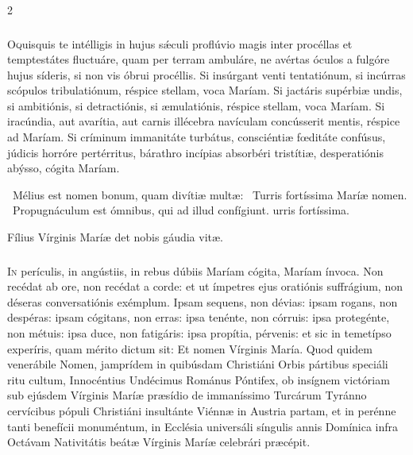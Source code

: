 \documentclass[9pt,twoside]{extarticle}
\begin{document}
\begin{multicols}{2}
\subsubsection*{\center {}}
\lettrine{O} quisquis te intélligis in hujus sǽculi proflúvio magis inter procéllas et temptestátes fluctuáre, quam per terram ambuláre, ne avértas óculos a fulgóre hujus síderis, si non vis óbrui procéllis. Si insúrgant venti tentatiónum, si incúrras scópulos tribulatiónum, réspice stellam, voca Maríam. Si jactáris supérbiæ undis, si ambitiónis, si detractiónis, si æmulatiónis, réspice stellam, voca Maríam. Si iracúndia, aut avarítia, aut carnis illécebra navículam concússerit mentis, réspice ad Maríam. Si críminum immanitáte turbátus, consciéntiæ fœditáte confúsus, júdicis horróre pertérritus, bárathro incípias absorbéri tristítiæ, desperatiónis abýsso, cógita Maríam.

\begin{tightlist}{}
\item {}~Mélius est nomen bonum, quam divítiæ multæ: \textred{*}~Turris fortíssima Maríæ nomen. ~Propugnáculum est ómnibus, qui ad illud confígiunt. urris fortíssima.
\item {\small {} Fílius Vírginis Maríæ det nobis gáudia vitæ.}
\end{tightlist}

\subsubsection*{\center {}}
\lettrine{I}n perículis, in angústiis, in rebus dúbiis Maríam cógita, Maríam ínvoca. Non recédat ab ore, non recédat a corde: et ut ímpetres ejus oratiónis suffrágium, non déseras conversatiónis exémplum. Ipsam sequens, non dévias: ipsam rogans, non despéras: ipsam cógitans, non erras: ipsa tenénte, non córruis: ipsa protegénte, non métuis: ipsa duce, non fatigáris: ipsa propítia, pérvenis: et sic in temetípso experíris, quam mérito dictum sit: Et nomen Vírginis María. Quod quidem venerábile Nomen, jamprídem in quibúsdam Christiáni Orbis pártibus speciáli ritu cultum, Innocéntius Undécimus Románus Póntifex, ob insígnem victóriam sub ejúsdem Vírginis Maríæ præsídio de immaníssimo Turcárum Tyránno cervícibus pópuli Christiáni insultánte Viénnæ in Austria partam, et in perénne tanti benefícii monuméntum, in Ecclésia universáli síngulis annis Domínica infra Octávam Nativitátis beátæ Vírginis Maríæ celebrári præcépit.


\end{multicols}
\end{document}
